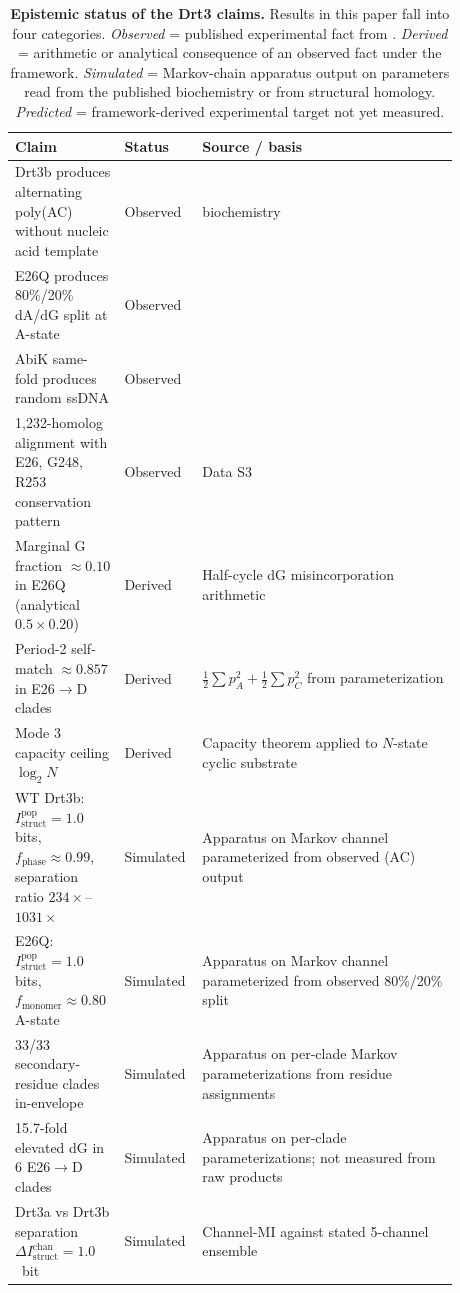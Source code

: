 \documentclass[aps,prx,reprint,amsmath,amssymb,floatfix,superscriptaddress,nofootinbib]{revtex4-2}
\theoremstyle{plain-thm}
\theoremstyle{definition-thm}
\newcommand{\Istructpop}{I_{\mathrm{struct}}^{\mathrm{pop}}}
\newcommand{\Istructchan}{I_{\mathrm{struct}}^{\mathrm{chan}}}
\newcommand{\fphase}{f_{\mathrm{phase}}}
\newcommand{\fmonomer}{f_{\mathrm{monomer}}}
\begin{document}
\begin{table}
\caption{\textbf{Epistemic status of the Drt3 claims.} Results in this paper fall into four categories. \emph{Observed} = published experimental fact from \citet{Deng2026}. \emph{Derived} = arithmetic or analytical consequence of an observed fact under the framework. \emph{Simulated} = Markov-chain apparatus output on parameters read from the published biochemistry or from structural homology. \emph{Predicted} = framework-derived experimental target not yet measured.}
\label{tab:epistemic_status}
\begin{tabular}{p{0.20\linewidth} p{0.13\linewidth} p{0.55\linewidth}}
\toprule
Claim & Status & Source / basis \\
\midrule
Drt3b produces alternating poly(AC) without nucleic acid template & Observed & \citet{Deng2026} biochemistry \\
E26Q produces 80\%/20\% dA/dG split at A-state & Observed & \citet[Fig.\ 4J]{Deng2026} \\
AbiK same-fold produces random ssDNA & Observed & \citet{Deng2026} \\
1,232-homolog alignment with E26, G248, R253 conservation pattern & Observed & \citet{Deng2026} Data S3 \\
Marginal G fraction $\approx 0.10$ in E26Q (analytical $0.5 \times 0.20$) & Derived & Half-cycle dG misincorporation arithmetic \\
Period-2 self-match $\approx 0.857$ in E26$\to$D clades & Derived & $\frac{1}{2}\sum p_A^2 + \frac{1}{2}\sum p_C^2$ from parameterization \\
Mode 3 capacity ceiling $\log_2 N$ & Derived & Capacity theorem applied to $N$-state cyclic substrate \\
WT Drt3b: $\Istructpop = 1.0$ bits, $\fphase \approx 0.99$, separation ratio $234\times$--$1031\times$ & Simulated & Apparatus on Markov channel parameterized from observed (AC) output \\
E26Q: $\Istructpop = 1.0$ bits, $\fmonomer \approx 0.80$ A-state & Simulated & Apparatus on Markov channel parameterized from observed 80\%/20\% split \\
33/33 secondary-residue clades in-envelope & Simulated & Apparatus on per-clade Markov parameterizations from residue assignments \\
15.7-fold elevated dG in 6 E26$\to$D clades & Simulated & Apparatus on per-clade parameterizations; not measured from raw products \\
Drt3a vs Drt3b separation $\Delta\Istructchan = 1.0$~bit & Simulated & Channel-MI against stated 5-channel ensemble \\

\end{tabular}
\end{table}
\end{document}
